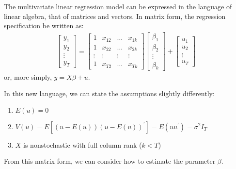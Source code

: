 \documentclass[letterpaper,10pt,english]{jupyterBook}
\begin{document}
The multivariate linear regression model can be expressed in the language of linear algebra, that of matrices and vectors. In matrix form, the regression specification be written as:
\begin{equation*}
\begin{split} \left[\begin{array}{c}
y_{1} \\
y_{2} \\
\vdots \\
y_{T}
\end{array}\right]=\left[\begin{array}{cccc}
1 & x_{12} & \ldots & x_{1 k} \\
1 & x_{22} & \ldots & x_{2 k} \\
\vdots & \vdots & \vdots & \vdots \\
1 & x_{T 2} & \ldots & x_{T k}
\end{array}\right]\left[\begin{array}{c}
\beta_{1} \\
\beta_{2} \\
\vdots \\
\beta_{k}
\end{array}\right]+\left[\begin{array}{c}
u_{1} \\
u_{2} \\
\vdots \\
u_{T}
\end{array}\right]\end{split}
\end{equation*}
or, more simply, \(y = X \beta + u\).

In this new language, we can state the assumptions slightly differently:
\begin{enumerate}
%
\item {} 
\(E(u) = 0\)

\item {} 
\(V(u)=E\left[(u-E(u))(u-E(u))^{\prime}\right]=E\left(u u^{\prime}\right)=\sigma^{2} I_{T}\)

\item {} 
\(X\) is nonstochastic with full column rank (\(k < T\))

\end{enumerate}

From this matrix form, we can consider how to estimate the parameter \(\beta\).
\end{document}
